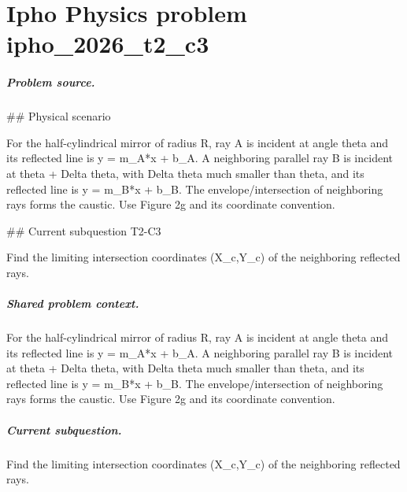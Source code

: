 
\chapter{Ipho Physics problem ipho\_2026\_t2\_c3}
\label{ch:IPhO2026Problems_problem_ipho_2026_t2_c3}

\paragraph{Problem source.}
\#\# Physical scenario

For the half-cylindrical mirror of radius R, ray A is incident at angle theta
and its reflected line is y = m\_A*x + b\_A.  A neighboring parallel ray B is
incident at theta + Delta theta, with Delta theta much smaller than theta, and
its reflected line is y = m\_B*x + b\_B.  The envelope/intersection of neighboring
rays forms the caustic.  Use Figure 2g and its coordinate convention.

\#\# Current subquestion T2-C3

Find the limiting intersection coordinates (X\_c,Y\_c) of the neighboring reflected rays.

\paragraph{Shared problem context.}
For the half-cylindrical mirror of radius R, ray A is incident at angle theta
and its reflected line is y = m\_A*x + b\_A.  A neighboring parallel ray B is
incident at theta + Delta theta, with Delta theta much smaller than theta, and
its reflected line is y = m\_B*x + b\_B.  The envelope/intersection of neighboring
rays forms the caustic.  Use Figure 2g and its coordinate convention.

\paragraph{Current subquestion.}
Find the limiting intersection coordinates (X\_c,Y\_c) of the neighboring reflected rays.

